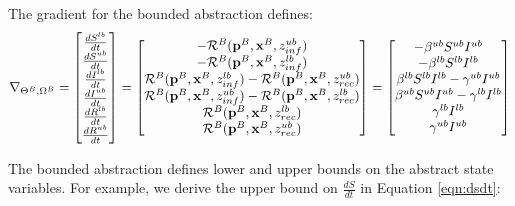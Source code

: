 \begin{example}
    The gradient for the bounded abstraction defines:
    \begin{eqnarray}
        \nabla_{\Theta^B, \Omega^B} = \begin{bmatrix} \frac{dS^{lb}}{dt}\\
                \frac{dS^{ub}}{dt}\\
                \frac{dI^{lb}}{dt}\\
                \frac{dI^{ub}}{dt}\\
                \frac{dR^{lb}}{dt}\\
                \frac{dR^{ub}}{dt} \end{bmatrix} = \begin{bmatrix} -{\cal
            R}^{B}({\bf p}^B, {\bf x}^B, z_{inf}^{ub})\\
            -{\cal R}^{B}({\bf p}^B, {\bf x}^B, z_{inf}^{lb})\\
             {\cal R}^{B}({\bf p}^B, {\bf x}^B, z_{inf}^{lb}) - {\cal
             R}^{B}({\bf p}^B, {\bf x}^B, z_{rec}^{ub})\\
             {\cal R}^{B}({\bf p}^B, {\bf x}^B, z_{inf}^{ub}) - {\cal
             R}^{B}({\bf p}^B, {\bf x}^B, z_{rec}^{lb})\\
             {\cal R}^{B}({\bf p}^B, {\bf x}^B, z_{rec}^{lb})\\
             {\cal R}^{B}({\bf p}^B, {\bf x}^B, z_{rec}^{ub}) \end{bmatrix} =
    \begin{bmatrix} -\beta^{ub} S^{ub} I^{ub}\\
        -\beta^{lb} S^{lb} I^{lb}\\
        \beta^{lb} S^{lb} I^{lb}-\gamma^{ub} I^{ub} \\
        \beta^{ub} S^{ub} I^{ub}-\gamma^{lb} I^{lb} \\
        \gamma^{lb} I^{lb}\\
        \gamma^{ub} I^{ub}
    \end{bmatrix} 
   \end{eqnarray}

\end{example}

The bounded abstraction defines lower and upper bounds on the abstract state variables.  For example, we derive the upper bound on $\frac{dS}{dt}$ in Equation \ref{eqn:dsdt}:

